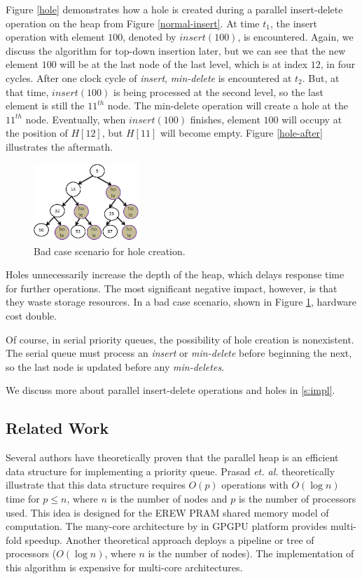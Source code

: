 Figure \ref{hole} demonstrates how a hole is created during a parallel insert-delete operation on the heap from Figure \ref{normal-insert}.
At time $t_1$, the insert operation with element $100$, denoted by $insert(100)$, is encountered.
Again, we discuss the algorithm for top-down insertion later, but we can see that the new element $100$ will be at the last node of the last level, which is at index $12$, in four cycles.
After one clock cycle of {\it insert}, {\it min-delete} is encountered at $t_2$.
But, at that time, $insert(100)$ is being processed at the second level, so the last element is still the $11^{th}$ node.
The min-delete operation will create a hole at the $11^{th}$ node.
Eventually, when $insert(100)$ finishes, element $100$ will occupy at the position of $H[12]$, but $H[11]$ will become empty.
Figure \ref{hole-after} illustrates the aftermath.

\begin{figure}[!ht]
  \centering
  \includegraphics[width=4cm]{fig/hole.png}
      \caption{Bad case scenario for hole creation.}
    \label{badcase}
\end{figure}

Holes unnecessarily increase the depth of the heap, which delays response time for further operations.
The most significant negative impact, however, is that they waste storage resources.
In a bad case scenario, shown in Figure \ref{badcase}, hardware cost double.

Of course, in serial priority queues, the possibility of hole creation is nonexistent. 
The serial queue must process an {\it insert} or {\it min-delete} before beginning the next, so the last node is updated before any {\it min-deletes}.

We discuss more about parallel insert-delete operations and holes in \autoref{s:impl}.

\subsection{Related Work}
Several authors have theoretically proven that the parallel heap is an efficient data structure for implementing a priority queue.
Prasad {\it et. al.} \cite{pq3} theoretically illustrate that this data structure requires $O(p)$ operations with $O(\log n)$ time for $p \leq n$, where $n$ is the number of nodes and $p$ is the number of processors used.
This idea is designed for the EREW PRAM shared memory model of computation.
The many-core architecture by \cite{pq2} in GPGPU platform provides multi-fold speedup.
Another theoretical approach \cite{pq4} deploys a pipeline or tree of processors ($O(\log n)$, where $n$ is the number of nodes).
The implementation of this algorithm \cite{pq5} is expensive for multi-core architectures.

